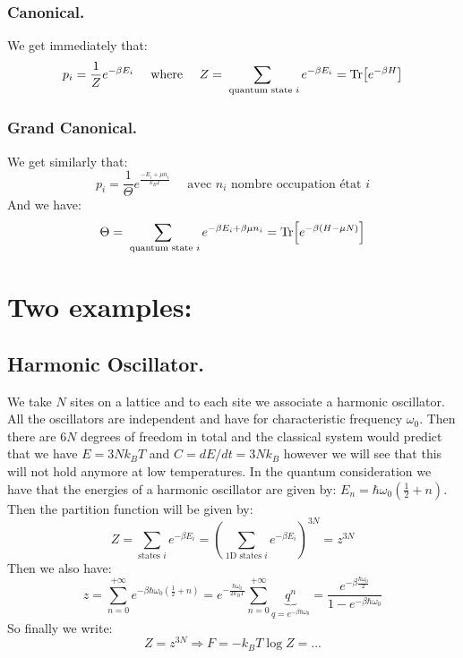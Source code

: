 \documentclass[10pt,a4paper]{book}
\begin{document}
\subsubsection{Canonical.}
We get immediately that:
\[
p_i = \frac{1}{Z} e^{-\beta E_i} \quad \text{ where } \quad Z = \sum_{ \text{ quantum state } i} e^{-\beta E_i} = \Tr[e^{-\beta H}]
\]
\subsubsection{Grand Canonical.}
We get similarly that:
\[
p_i = \frac{1}{\Theta} e^{\frac{-E_i + \mu n_i}{k_B T}} \quad \text{ avec } n_i \text{ nombre occupation état } i
\]
And we have:
\[
\Theta = \sum_{\text{ quantum state }i} e^{-\beta E_i + \beta \mu n_i} = \Tr[e^{-\beta(H - \mu N)}]
\]

\section{Two examples:}
\subsection{Harmonic Oscillator.}
We take $N$ sites on a lattice and to each site we associate a harmonic oscillator. All the oscillators are independent and have for characteristic frequency $\omega_0$. Then there are $6N$ degrees of freedom in total and the classical system would predict that we have $E = 3Nk_B T$ and $C = dE/dt = 3Nk_B$ however we will see that this will not hold anymore at low temperatures. In the quantum consideration we have that the energies of a harmonic oscillator are given by: $E_n = \hbar \omega_0 (\frac{1}{2} + n)$. Then the partition function will be given by:
\[
Z = \sum_{\text{states } i} e^{-\beta E_i} = \left(\sum_{\text{1D states } i} e^{-\beta E_i}\right)^{3N}=z^{3N}
\] 
Then we also have:
\[
z = \sum_{n = 0}^{+\infty} e^{-\beta \hbar \omega_0(\frac{1}{2} + n)} = e^{-\frac{\hbar \omega_0}{2 k_B T}} \sum_{n = 0}^{+\infty} \underbrace{q^n}_{q = e^{-\beta \hbar\omega_0}} = \frac{e^{-\beta \frac{\hbar \omega_0}{2}}}{1 - e^{-\beta \hbar \omega_0}}
\]
So finally we write:
\[
Z = z^{3N} \Rightarrow F = - k_B T \log Z=...
\]
\end{document}
